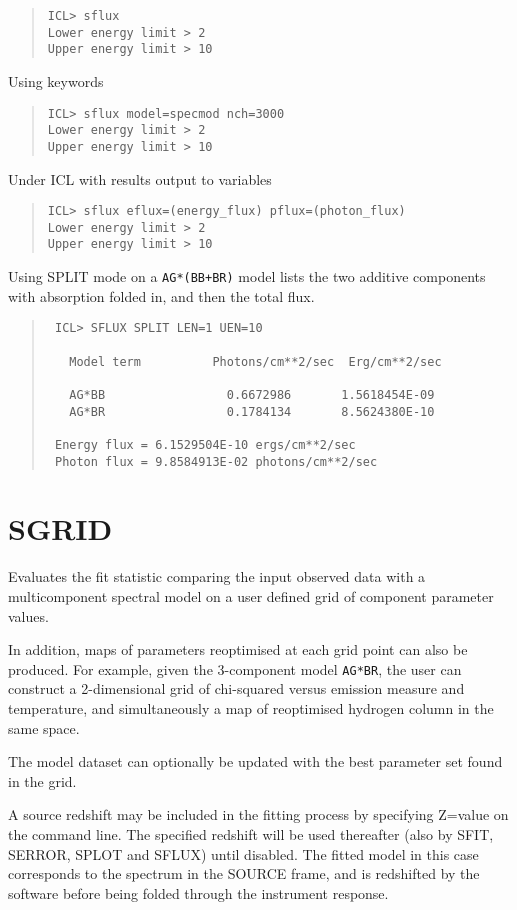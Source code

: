 \documentclass{book}
\renewcommand{\_}{{\tt\char'137}}     %
\begin{document}
\begin{quote}\begin{verbatim}
ICL> sflux
Lower energy limit > 2
Upper energy limit > 10
\end{verbatim}\end{quote}
Using keywords
\begin{quote}\begin{verbatim}
ICL> sflux model=specmod nch=3000
Lower energy limit > 2
Upper energy limit > 10
\end{verbatim}\end{quote}
Under ICL with results output to variables
\begin{quote}\begin{verbatim}
ICL> sflux eflux=(energy_flux) pflux=(photon_flux)
Lower energy limit > 2
Upper energy limit > 10
\end{verbatim}\end{quote}
Using SPLIT mode on a {\tt AG*(BB+BR)} model lists the two additive
components with absorption folded in, and then the total flux.
\begin{quote}\begin{verbatim}
 ICL> SFLUX SPLIT LEN=1 UEN=10

   Model term          Photons/cm**2/sec  Erg/cm**2/sec

   AG*BB                 0.6672986       1.5618454E-09
   AG*BR                 0.1784134       8.5624380E-10

 Energy flux = 6.1529504E-10 ergs/cm**2/sec
 Photon flux = 9.8584913E-02 photons/cm**2/sec
\end{verbatim}\end{quote}
\section{SGRID}
Evaluates the fit statistic comparing the input observed data
with a multicomponent spectral model on a user defined grid of
component parameter values.

In addition, maps of parameters reoptimised at each grid point
can also be produced. For example, given the 3-component model
{\tt AG*BR}, the user can construct a 2-dimensional grid of chi-squared
versus emission measure and temperature, and simultaneously a
map of reoptimised hydrogen column in the same space.

The model dataset can optionally be updated with the best
parameter set found in the grid.

A source redshift may be included in the fitting process by
specifying Z=value on the command line. The specified redshift
will be used thereafter (also by SFIT, SERROR, SPLOT and SFLUX)
until disabled. The fitted model in this case corresponds to the
spectrum in the SOURCE frame, and is redshifted by the software
before being folded through the instrument response.
\end{document}
